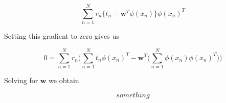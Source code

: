 \documentclass[a4paper]{article}
\begin{document}
\begin{equation}
\sum_{n=1}^{N} r_n \big\{ t_n - \textbf{w}^T \phi(x_n) \big\} \phi(x_n)^T
\end{equation}

Setting this gradient to zero gives us

\begin{equation}
0 = \sum_{n=1}^{N} r_n \Bigg( \sum_{n=1}^{N} t_n \phi(x_n)^T - \textbf{w}^T \bigg( \sum_{n=1}^{N} \phi(x_n) \phi(x_n)^T  \bigg)  \Bigg)
\end{equation}

Solving for $\textbf{w}$ we obtain

\begin{equation}
something
\end{equation}
\end{document}
